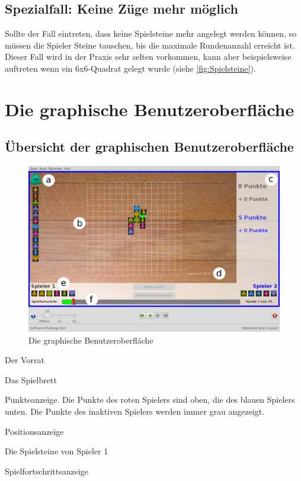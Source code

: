 \documentclass[a4paper, ngerman]{scrartcl}
\begin{document}
\subsection{Spezialfall: Keine Züge mehr möglich}
Sollte der Fall eintreten, dass keine Spielsteine mehr angelegt werden können, so müssen die Spieler Steine tauschen, bis die maximale Rundenanzahl erreicht ist. Dieser Fall wird in der Praxis sehr selten vorkommen, kann aber beispielsweise auftreten wenn ein 6x6-Quadrat gelegt wurde (siehe \autoref{fig:Spielsteine}).
\newpage
	
\section{Die graphische Benutzeroberfläche}
\subsection{Übersicht der graphischen Benutzeroberfläche}
\begin{figure}[h]
	\centering
	\includegraphics[width = \textwidth]{images/GUI}
	\caption{Die graphische Benutzeroberfläche}
\end{figure}
\begin{compactenum}[a)]
	\item Der Vorrat
	\item Das Spielbrett
	\item Punkteanzeige. Die Punkte des roten Spielers sind
	oben, die des blauen Spielers unten. Die Punkte des inaktiven Spielers werden immer grau angezeigt.
	\item Positionsanzeige
	\item Die Spielsteine von Spieler 1
	\item Spielfortschrittsanzeige
\end{compactenum}
	
\end{document}
